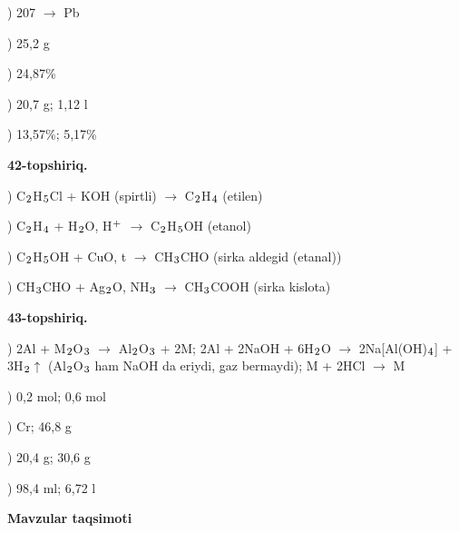 \documentclass[11pt,a4paper]{article}
\renewcommand{\textsubscript}[1]{\ensuremath{_{\text{\fontsize{8}{8}\selectfont #1}}}}
\renewcommand{\textsuperscript}[1]{\ensuremath{^{\text{\fontsize{8}{8}\selectfont #1}}}}
\begin{document}
) 207 $\to$ Pb\par
{}) 25,2 g\par
{}) 24,87\%\par
{}) 20,7 g; 1,12 l\par
{}) 13,57\%; 5,17\%\par
\noindent\textbf{42-topshiriq.}\par
{}) C\textsubscript{2}H\textsubscript{5}Cl + KOH (spirtli) $\to$ C\textsubscript{2}H\textsubscript{4} (etilen)\par
{}) C\textsubscript{2}H\textsubscript{4} + H\textsubscript{2}O, H\textsuperscript{+} $\to$ C\textsubscript{2}H\textsubscript{5}OH (etanol)\par
{}) C\textsubscript{2}H\textsubscript{5}OH + CuO, t\textdegree{} $\to$ CH\textsubscript{3}CHO (sirka aldegid (etanal))\par
{}) CH\textsubscript{3}CHO + Ag\textsubscript{2}O, NH\textsubscript{3} $\to$ CH\textsubscript{3}COOH (sirka kislota)\par
\noindent\textbf{43-topshiriq.}\par
{}) 2Al + M\textsubscript{2}O\textsubscript{3} $\to$ Al\textsubscript{2}O\textsubscript{3} + 2M; 2Al + 2NaOH + 6H\textsubscript{2}O $\to$ 2Na[Al(OH)\textsubscript{4}] + 3H\textsubscript{2}$\uparrow$ (Al\textsubscript{2}O\textsubscript{3} ham NaOH da eriydi, gaz bermaydi); M + 2HCl $\to$ M\par
{}) 0,2 mol; 0,6 mol\par
{}) Cr; 46,8 g\par
{}) 20,4 g; 30,6 g\par
{}) 98,4 ml; 6,72 l\par
\par\bigskip\noindent\textbf{Mavzular taqsimoti}\par\smallskip
\end{document}

